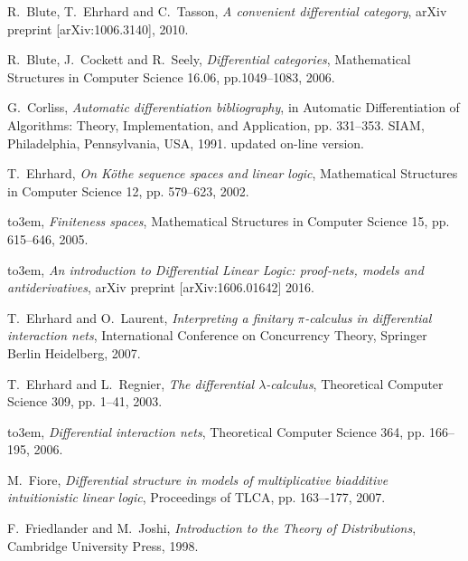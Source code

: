\documentclass[english,letter paper,12pt,reqno]{article}
\theoremstyle{example}
\begin{document}

\providecommand{\bysame}{\leavevmode\hbox to3em{\hrulefill}\thinspace}
\providecommand{\href}[2]{#2}
\begin{thebibliography}{BHLS03}

R.~Blute, T.~Ehrhard and C.~Tasson, \textsl{A convenient differential category}, arXiv preprint \href{https://arxiv.org/abs/1006.3140}{[arXiv:1006.3140]}, 2010.

R.~Blute, J.~Cockett and R.~Seely, \textsl{Differential categories}, Mathematical Structures in Computer Science 16.06, pp.1049--1083, 2006.

G.~Corliss, \textsl{Automatic differentiation bibliography}, in Automatic Differentiation of Algorithms: Theory, Implementation, and Application, pp. 331--353. SIAM, Philadelphia, Pennsylvania, USA, 1991.  \href{http://liinwww.ira.uka.de/bibliography/-Math/auto.diff.html}{updated on-line version}.

T.~Ehrhard, \textsl{On K\"othe sequence spaces and linear logic}, Mathematical Structures in Computer Science 12, pp. 579--623, 2002.

\bysame, \textsl{Finiteness spaces}, Mathematical Structures in Computer Science 15, pp. 615--646, 2005.

\bysame, \textsl{An introduction to Differential Linear Logic: proof-nets, models and antiderivatives}, arXiv preprint \href{https://arxiv.org/abs/1606.01642}{[arXiv:1606.01642]} 2016.

T.~Ehrhard and O.~Laurent, \textsl{Interpreting a finitary $\pi$-calculus in differential interaction nets}, International Conference on Concurrency Theory, Springer Berlin Heidelberg, 2007.

T.~Ehrhard and L.~Regnier, \textsl{The differential $\lambda$-calculus}, Theoretical Computer Science 309, pp. 1--41, 2003.

\bysame, \textsl{Differential interaction nets}, Theoretical Computer Science 364, pp. 166--195, 2006.

M.~Fiore, \textsl{Differential structure in models of multiplicative biadditive intuitionistic linear logic}, Proceedings of TLCA, pp. 163–-177, 2007.

F.~Friedlander and M.~Joshi, \textsl{Introduction to the Theory of Distributions}, Cambridge University Press, 1998.


\end{thebibliography}
\end{document}
